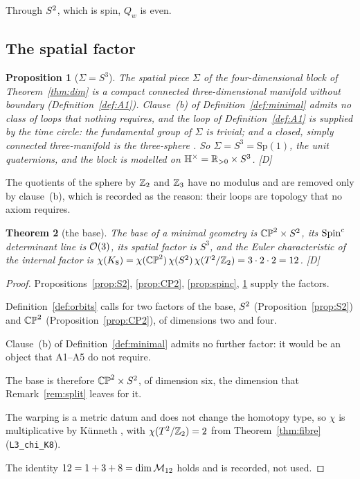 \documentclass[11pt,a4paper]{article}
\theoremstyle{plain}
\newtheorem{theorem}{Theorem}[section]
\newtheorem{proposition}[theorem]{Proposition}
\theoremstyle{definition}
\theoremstyle{remark}
\newcommand{\Hquat}{\mathbb{H}}
\newcommand{\rigD}{[\textup{D}]}
\begin{document}
Through $S^2$, which is spin, $Q_{w}$ is even.

\subsection{The spatial factor}

\begin{proposition}[$\Sigma=S^{3}$]\label{prop:S3}
The spatial piece $\Sigma$ of the four-dimensional block of Theorem~\ref{thm:dim} is a compact connected three-dimensional manifold without boundary (Definition~\ref{def:A1}). Clause~(b) of Definition~\ref{def:minimal} admits no class of loops that nothing requires, and the loop of Definition~\ref{def:A1} is supplied by the time circle: the fundamental group of $\Sigma$ is trivial; and a closed, simply connected three-manifold is the three-sphere \cite{MorganTian}. So $\Sigma=S^{3}=\mathrm{Sp}(1)$, the unit quaternions, and the block is modelled on $\Hquat^{\times}=\R_{>0}\times S^{3}$. \rigD
\end{proposition}

The quotients of the sphere by $\mathbb{Z}_{2}$ and $\mathbb{Z}_{3}$ have no modulus and are removed only by clause~(b), which is recorded as the reason: their loops are topology that no axiom requires.

\begin{theorem}[the base]\label{thm:base}
The base of a minimal geometry is $\mathbb{CP}^2\times S^2$, its $\text{Spin}^c$ determinant line is $\mathcal{O}(3)$, its spatial factor is $S^{3}$, and the Euler characteristic of the internal factor is $\chi(K_8)=\chi(\mathbb{CP}^2)\,\chi(S^2)\,\chi(T^2/\mathbb{Z}_2)=3\cdot2\cdot2=12$. \rigD
\end{theorem}

\begin{proof}
Propositions~\ref{prop:S2}, \ref{prop:CP2}, \ref{prop:spinc}, \ref{prop:S3} supply the factors.

Definition~\ref{def:orbits} calls for two factors of the base, $S^2$ (Proposition~\ref{prop:S2}) and $\mathbb{CP}^2$ (Proposition~\ref{prop:CP2}), of dimensions two and four.

Clause~(b) of Definition~\ref{def:minimal} admits no further factor: it would be an object that A1--A5 do not require.

The base is therefore $\mathbb{CP}^2\times S^2$, of dimension six, the dimension that Remark~\ref{rem:split} leaves for it.

The warping is a metric datum and does not change the homotopy type, so $\chi$ is multiplicative by K\"unneth \cite{Hatcher}, with $\chi(T^2/\mathbb{Z}_2)=2$ from Theorem~\ref{thm:fibre} (\texttt{L3\_chi\_K8}).

The identity $12=1+3+8=\dim\mathcal{M}_{12}$ holds and is recorded, not used.
\end{proof}
\end{document}
